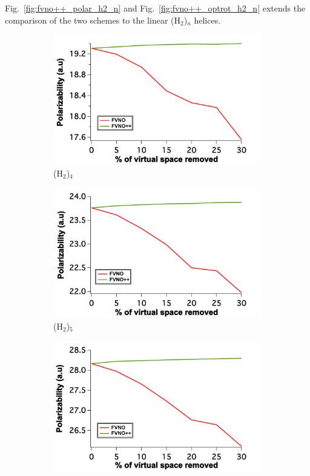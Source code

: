 Fig.~\ref{fig:fvno++_polar_h2_n} and Fig.~\ref{fig:fvno++_optrot_h2_n} extends the comparison of the two schemes 
to the linear (H$_2$)$_n$ helices.
\begin{figure}
\begin{subfigure}{.5\textwidth}
  \centering
  \includegraphics[width=.9\linewidth]{figures_fvno++/fvno++_h2_4_adz_polar.pdf}
  \caption{(H$_2$)$_4$}
  \label{fig:sfig1}
\end{subfigure}%
\begin{subfigure}{.5\textwidth}
  \centering
  \includegraphics[width=.9\linewidth]{figures_fvno++/fvno++_h2_5_adz_polar.pdf}
  \caption{(H$_2$)$_5$}
  \label{fig:sfig2}
\end{subfigure}
\begin{subfigure}{.5\textwidth}
  \centering
  \includegraphics[width=.9\linewidth]{figures_fvno++/fvno++_h2_6_adz_polar.pdf}

\end{subfigure}
\end{figure}
